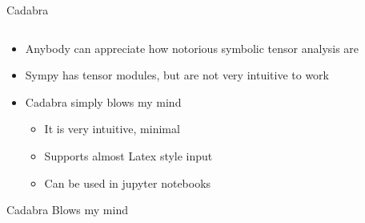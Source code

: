 \documentclass[aspectratio=169]{beamer}
\begin{document}
\begin{frame}[fragile]{Cadabra}
     \begin{columns}
        \begin{column}{0.52\textwidth}
            \begin{itemize}
                \item Anybody can appreciate how notorious symbolic tensor analysis are
                \item Sympy has tensor modules, but are not very intuitive to work
                \item Cadabra simply blows my mind
                    \begin{itemize}
                        \item It is very intuitive, minimal 
                        \item Supports almost Latex style input
                        \item Can be used in jupyter notebooks
                    \end{itemize}
            \end{itemize}
            \begin{block}{Cadabra}
                Blows my mind
            \end{block}
        \end{column}
        \begin{column}{0.46\textwidth}
\end{column}
\end{columns}
\end{frame}
\end{document}
